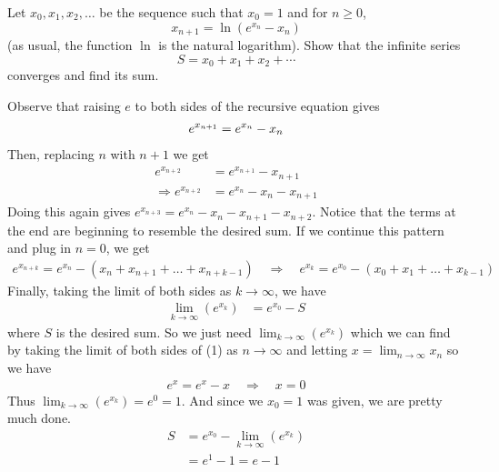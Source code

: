 \begin{problem}[D][8][Putnam 2016 B1]
        Let $x_0, x_1, x_2, \dots$ be the sequence such that $x_0 = 1$ and for $n \geq 0$,
        \[
        x_{n+1} = \ln\left(e^{x_n} - x_n\right)
        \]
        (as usual, the function $\ln$ is the natural logarithm). Show that the infinite series
        \[
        S = x_0 + x_1 + x_2 + \cdots
        \]
        converges and find its sum.
\end{problem}

\begin{solution}
   Observe that raising $e$ to both sides of the recursive equation gives
   \begin{align}\setcounter{equation}{0}
       e^{x_{n+1}}=e^{x_n}-x_n
   \end{align}
   Then, replacing $n$ with $n+1$ we get
   \begin{align*}
        e^{x_{n+2}} &= e^{x_{n+1}}-x_{n+1}\\
        \Rightarrow e^{x_{n+2}} &= e^{x_n}-x_n-x_{n+1}
   \end{align*}
   Doing this again gives $e^{x_{n+3}} = e^{x_n}-x_n-x_{n+1}-x_{n+2}$. Notice that the terms at the end are beginning to resemble the desired sum. If we continue this pattern and plug in $n=0$, we get
   \begin{align*}
        e^{x_{n+k}} = e^{x_n}-(x_n+x_{n+1}+\dots+x_{n+k-1}) \quad \Rightarrow \quad e^{x_{k}} = e^{x_0}-(x_0+x_{1}+\dots+x_{k-1})
   \end{align*}
   Finally, taking the limit of both sides as $k \rightarrow \infty$, we have
      \begin{align*}
        \lim_{k\rightarrow\infty}(e^{x_{k}}) &= e^{x_0}-S
   \end{align*}
   where $S$ is the desired sum. So we just need $\lim_{k\rightarrow\infty}(e^{x_{k}})$ which we can find by taking the limit of both sides of (1) as $n\rightarrow\infty$ and letting $x=\lim_{n\rightarrow\infty}x_n$ so we have 
   \begin{align*}
       e^x=e^x-x \quad \Rightarrow \quad x=0
   \end{align*}
   Thus $\lim_{k\rightarrow\infty}(e^{x_{k}}) = e^0 = 1$. And since we $x_0=1$ was given, we are pretty much done.
   \begin{align*}
       S &= e^{x_0}-\lim_{k\rightarrow\infty}(e^{x_{k}})\\
       &= e^1 - 1 = \boxed{e-1}
   \end{align*}
\end{solution}

